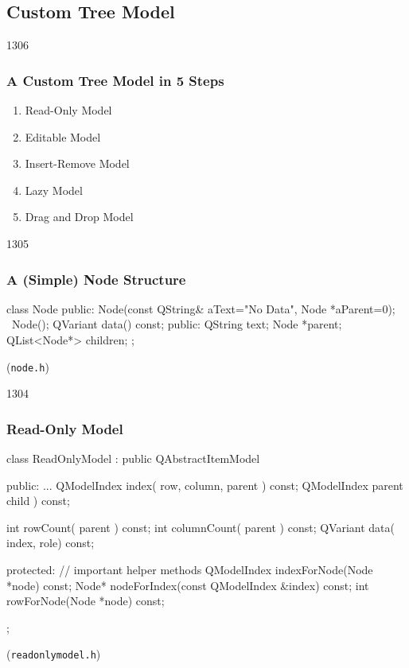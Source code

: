 %
%
%
%

\subsection{Custom Tree Model}

\begin{slide}{1306}
  \frametitle{A Custom Tree Model in 5 Steps}
  \begin{enumerate}
  \item Read-Only Model
  \item Editable Model
  \item Insert-Remove Model
  \item Lazy Model
  \item Drag and Drop Model
  \end{enumerate}
\end{slide}
\begin{slide}[fragile]{1305}
  \frametitle{A (Simple) Node Structure}
  \begin{cpp}
class Node {
public:
  Node(const QString& aText="No Data", Node *aParent=0);
  ~Node();
  QVariant data() const;
public:
  QString text;
  Node *parent;
  QList<Node*> children;
};
  \end{cpp}
   \footnotesize{ (\texttt{node.h})}

\end{slide}

\begin{slide}[fragile]{1304}
  \frametitle{Read-Only Model}
  \begin{cpp}
class ReadOnlyModel : public QAbstractItemModel {
public:
  ...
  QModelIndex index( row, column, parent ) const;
  QModelIndex parent child ) const;

  int rowCount( parent ) const;
  int columnCount( parent ) const;
  QVariant data( index, role) const;

protected: // important helper methods
  QModelIndex indexForNode(Node *node) const;
  Node* nodeForIndex(const QModelIndex &index) const;
  int rowForNode(Node *node) const;
};    
  \end{cpp}
   \footnotesize{ (\texttt{readonlymodel.h})}
\end{slide}

